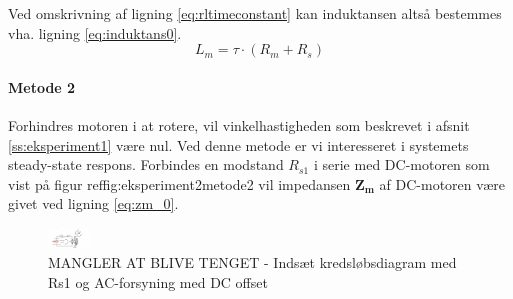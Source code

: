 Ved omskrivning af ligning \ref{eq:rltimeconstant} kan induktansen altså bestemmes vha. ligning \ref{eq:induktans0}.
\begin{equation}
	L_m=\tau\cdot(R_m+R_s)
	\label{eq:induktans0} 
 \end{equation}
\paragraph{Metode 2\\}
Forhindres motoren i at rotere, vil vinkelhastigheden som beskrevet i afsnit \ref{ss:eksperiment1} være nul.
Ved denne metode er vi interesseret i systemets steady-state respons.
Forbindes en modstand \(R_{s1}\) i serie med DC-motoren som vist på figur ref{fig:eksperiment2metode2}
vil impedansen \(\mathbf{Z_m}\) af DC-motoren være givet ved ligning \ref{eq:zm_0}.

\begin{figure}[!th]
\centering
\includegraphics[width=0.1\textwidth]{./graphics/Mangleratblivetegnet3}
%
\caption[]{MANGLER AT BLIVE TENGET - Indsæt kredsløbsdiagram med Rs1 og AC-forsyning med DC offset}
\label{fig:eksperiment2metode2}
\end{figure}



